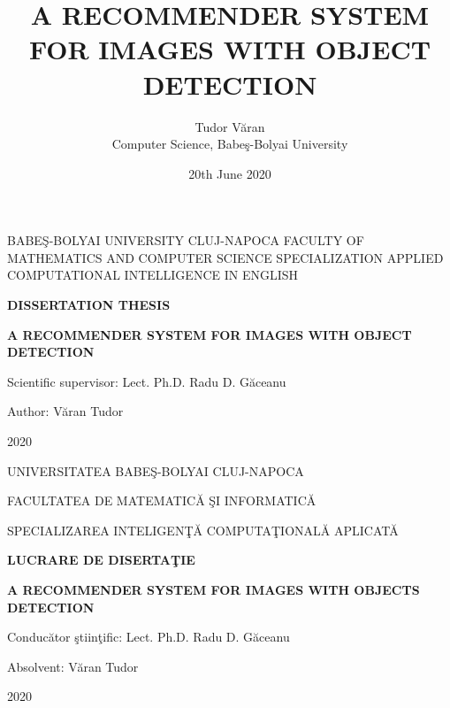 \documentclass[a4paper,12pt]{report}
\title{A RECOMMENDER SYSTEM FOR IMAGES WITH OBJECT DETECTION}
\date{20th June 2020}
\author{Tudor V\u aran\\ Computer Science, Babe\c s-Bolyai University}
\begin{document}
\pagestyle{headings}

\begin{titlepage}
\sloppy
\begin{center}
\Large{BABE\c{S}-BOLYAI UNIVERSITY CLUJ-NAPOCA}
\Large{FACULTY OF MATHEMATICS AND COMPUTER SCIENCE}
\Large{SPECIALIZATION APPLIED COMPUTATIONAL INTELLIGENCE IN ENGLISH}

\vspace{4cm}
\Large \textbf{DISSERTATION THESIS}

\vspace{1.3cm}
\Huge \textbf{A RECOMMENDER SYSTEM FOR IMAGES WITH OBJECT DETECTION}
\end{center}
\vspace{3cm}

\begin{flushleft}
    \Large{Scientific supervisor: Lect. Ph.D. Radu D. G\u{a}ceanu}
\end{flushleft}
\vspace{1cm}

\begin{flushright}
    \Large{Author: V\u{a}ran Tudor}
\end{flushright}

\vspace{1cm}
\begin{center}
\Large{2020}
\end{center}
\end{titlepage}
\begin{titlepage}
\sloppy
\begin{center}
\Large{UNIVERSITATEA BABE\c{S}-BOLYAI CLUJ-NAPOCA}

\Large{FACULTATEA DE MATEMATIC\u{A} \c{S}I INFORMATIC\u{A} }

\Large{SPECIALIZAREA INTELIGEN\c{T}\u{A} COMPUTA\c{T}IONAL\u{A} APLICAT\u{A}}



\vspace{3cm}

\Large \textbf{LUCRARE DE DISERTA\c{T}IE}
\par\vspace{1.3cm}
\Huge \textbf{A RECOMMENDER SYSTEM FOR IMAGES WITH OBJECTS DETECTION}

\end{center}
\vspace{2.5cm}

\begin{flushleft}
    \Large{Conduc\u{a}tor \c{s}tiin\c{t}ific: Lect. Ph.D. Radu D. G\u{a}ceanu}
\end{flushleft}

\vspace{1cm}

\begin{flushright}
\Large{Absolvent: V\u{a}ran Tudor}

\end{flushright}

\vspace{1cm}

\begin{center}
\Large{2020}
\end{center}

\end{titlepage}
\end{document}
